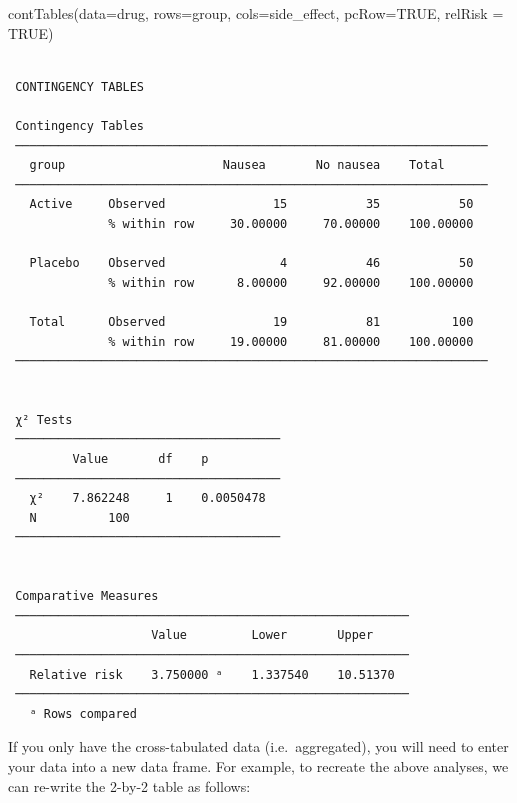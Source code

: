 \documentclass[
  a4paper,
]{memoir}
\newenvironment{Shaded}{\begin{snugshade}}{\end{snugshade}}
\newcommand{\AttributeTok}[1]{\textcolor[rgb]{0.00,0.00,0.00}{#1}}
\newcommand{\ConstantTok}[1]{\textcolor[rgb]{0.00,0.00,0.00}{#1}}
\newcommand{\FunctionTok}[1]{\textcolor[rgb]{0.00,0.00,0.00}{#1}}
\newcommand{\NormalTok}[1]{\textcolor[rgb]{0.00,0.00,0.00}{#1}}
\begin{document}
\begin{Shaded}
\begin{Highlighting}[]
\FunctionTok{contTables}\NormalTok{(}\AttributeTok{data=}\NormalTok{drug, }
           \AttributeTok{rows=}\NormalTok{group, }\AttributeTok{cols=}\NormalTok{side\_effect, }
           \AttributeTok{pcRow=}\ConstantTok{TRUE}\NormalTok{, }\AttributeTok{relRisk =} \ConstantTok{TRUE}\NormalTok{)}
\end{Highlighting}
\end{Shaded}

\begin{verbatim}

 CONTINGENCY TABLES

 Contingency Tables                                                 
 ────────────────────────────────────────────────────────────────── 
   group                      Nausea       No nausea    Total       
 ────────────────────────────────────────────────────────────────── 
   Active     Observed               15           35           50   
              % within row     30.00000     70.00000    100.00000   
                                                                    
   Placebo    Observed                4           46           50   
              % within row      8.00000     92.00000    100.00000   
                                                                    
   Total      Observed               19           81          100   
              % within row     19.00000     81.00000    100.00000   
 ────────────────────────────────────────────────────────────────── 


 χ² Tests                              
 ───────────────────────────────────── 
         Value       df    p           
 ───────────────────────────────────── 
   χ²    7.862248     1    0.0050478   
   N          100                      
 ───────────────────────────────────── 


 Comparative Measures                                    
 ─────────────────────────────────────────────────────── 
                    Value         Lower       Upper      
 ─────────────────────────────────────────────────────── 
   Relative risk    3.750000 ᵃ    1.337540    10.51370   
 ─────────────────────────────────────────────────────── 
   ᵃ Rows compared
\end{verbatim}

If you only have the cross-tabulated data (i.e.~aggregated), you will
need to enter your data into a new data frame. For example, to recreate
the above analyses, we can re-write the 2-by-2 table as follows:
\end{document}
